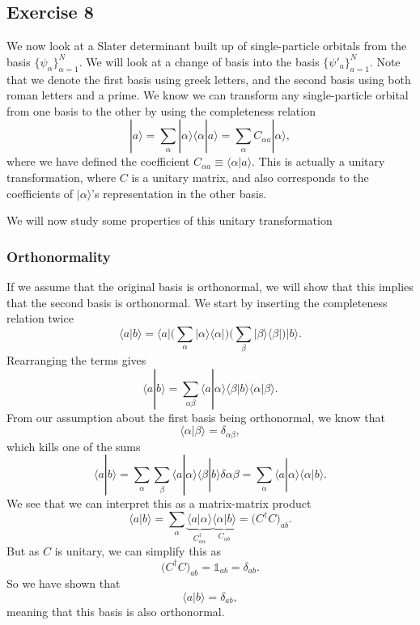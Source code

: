 \documentclass[a4paper, 11pt, notitlepage, english]{article}
\newcommand{\bra}[1]{\langle #1|}
\newcommand{\ket}[1]{|#1 \rangle}
\newcommand{\braket}[2]{\langle #1 | #2 \rangle}
\newcommand{\ketbra}[2]{\ket{#1}\bra{#2}}
\begin{document}
\subsection*{Exercise 8}
We now look at a Slater determinant built up of single-particle orbitals from the basis $\{\psi_\alpha\}_{\alpha=1}^N$. We will look at a change of basis into the basis $\{\psi'_a\}_{a=1}^N$. Note that we denote the first basis using greek letters, and the second basis using both roman letters and a prime. We know we can transform any single-particle orbital from one basis to the other by using the completeness relation
$$\ket{a} = \sum_{\alpha} \ket{\alpha}\braket{\alpha}{a} = \sum_{\alpha} C_{\alpha a} \ket{\alpha},$$
where we have defined the coefficient $C_{\alpha a} \equiv \braket{\alpha}{a}$. This is actually a unitary transformation, where $C$ is a unitary matrix, and also corresponds to the coefficients of $\ket{\alpha}$'s representation in the other basis. 

We will now study some properties of this unitary transformation

\subsubsection*{Orthonormality}
If we assume that the original basis is orthonormal, we will show that this implies that the second basis is orthonormal. We start by inserting the completeness relation twice
$$\braket{a}{b} = \bra{a} \bigg(\sum_\alpha \ketbra{\alpha}{\alpha} \bigg)\bigg(\sum_\beta \ketbra{\beta}{\beta}  \bigg) \ket{b}.$$
Rearranging the terms gives
$$\braket{a}{b} = \sum_{\alpha\beta} \braket{a}{\alpha} \braket{\beta}{b} \braket{\alpha}{\beta}.$$
From our assumption about the first basis being orthonormal, we know that
$$\braket{\alpha}{\beta} = \delta_{\alpha\beta},$$
which kills one of the sums
$$\braket{a}{b} = \sum_\alpha \sum_\beta \braket{a}{\alpha} \braket{\beta}{b} \delta{\alpha\beta} = \sum_\alpha  \braket{a}{\alpha} \braket{\alpha}{b}.$$
We see that we can interpret this as a matrix-matrix product
$$\braket{a}{b} = \sum_\alpha \underbrace{\braket{a}{\alpha}}_{C^\dag_{a\alpha}} \underbrace{\braket{\alpha}{b}}_{C_{\alpha b}} = \bigg(C^\dag C\bigg)_{ab}.$$
But as $C$ is unitary, we can simplify this as
$$\bigg(C^\dag C\bigg)_{ab} = \mathbb{1}_{ab} = \delta_{ab}.$$
So we have shown that
$$\braket{a}{b} = \delta_{ab},$$
meaning that this basis is also orthonormal.
\end{document}
